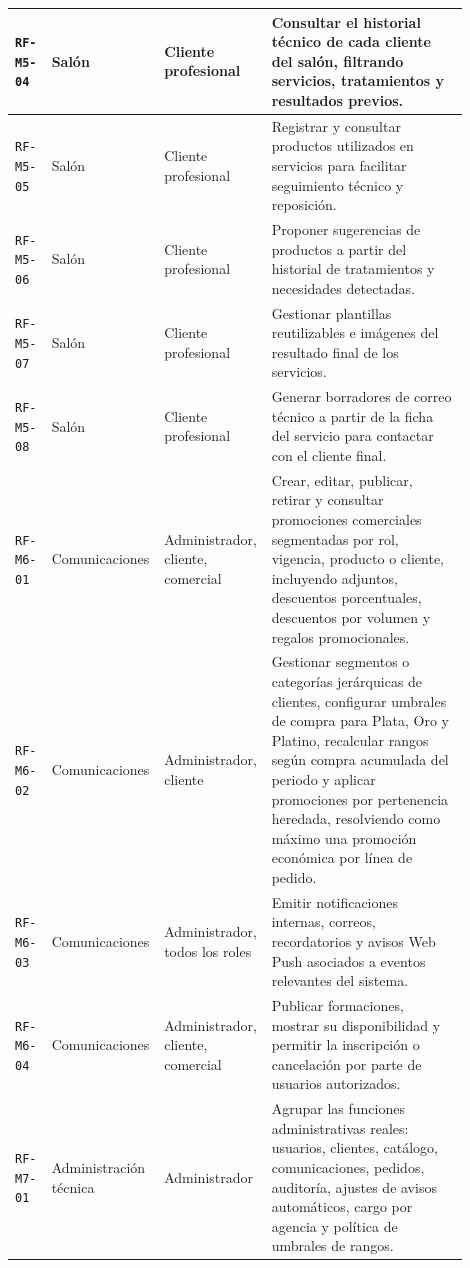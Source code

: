 {\begin{supertabular}{|>{\raggedright\arraybackslash}p{0.085\linewidth}|>{\raggedright\arraybackslash}p{0.205\linewidth}|>{\raggedright\arraybackslash}p{0.18\linewidth}|>{\raggedright\arraybackslash}p{0.43\linewidth}|}
\hline
\texttt{RF-M5-04} & Salón & Cliente profesional & Consultar el historial técnico de cada cliente del salón, filtrando servicios, tratamientos y resultados previos. \\
\hline
\texttt{RF-M5-05} & Salón & Cliente profesional & Registrar y consultar productos utilizados en servicios para facilitar seguimiento técnico y reposición. \\
\hline
\texttt{RF-M5-06} & Salón & Cliente profesional & Proponer sugerencias de productos a partir del historial de tratamientos y necesidades detectadas. \\
\hline
\texttt{RF-M5-07} & Salón & Cliente profesional & Gestionar plantillas reutilizables e imágenes del resultado final de los servicios. \\
\hline
\texttt{RF-M5-08} & Salón & Cliente profesional & Generar borradores de correo técnico a partir de la ficha del servicio para contactar con el cliente final. \\
\hline
{}
\texttt{RF-M6-01} & Comunicaciones & Administrador, cliente, comercial & Crear, editar, publicar, retirar y consultar promociones comerciales segmentadas por rol, vigencia, producto o cliente, incluyendo adjuntos, descuentos porcentuales, descuentos por volumen y regalos promocionales. \\
\hline
\texttt{RF-M6-02} & Comunicaciones & Administrador, cliente & Gestionar segmentos o categorías jerárquicas de clientes, configurar umbrales de compra para Plata, Oro y Platino, recalcular rangos según compra acumulada del periodo y aplicar promociones por pertenencia heredada, resolviendo como máximo una promoción económica por línea de pedido. \\
\hline
\texttt{RF-M6-03} & Comunicaciones & Administrador, todos los roles & Emitir notificaciones internas, correos, recordatorios y avisos Web Push asociados a eventos relevantes del sistema. \\
\hline
\texttt{RF-M6-04} & Comunicaciones & Administrador, cliente, comercial & Publicar formaciones, mostrar su disponibilidad y permitir la inscripción o cancelación por parte de usuarios autorizados. \\
\hline
{}
\texttt{RF-M7-01} & Administración técnica & Administrador & Agrupar las funciones administrativas reales: usuarios, clientes, catálogo, comunicaciones, pedidos, auditoría, ajustes de avisos automáticos, cargo por agencia y política de umbrales de rangos. \\

\end{supertabular}}
